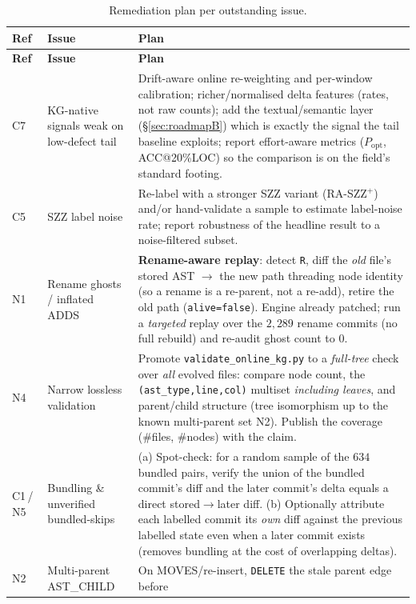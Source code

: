 \documentclass[11pt,a4paper]{article}
\newcommand{\code}[1]{\texttt{#1}}
\newcommand{\edge}[1]{\textsc{#1}}
\begin{document}
	\begin{longtable}{@{}p{0.9cm}p{5.2cm}p{8.4cm}@{}}
	\caption{Remediation plan per outstanding issue.}\label{tab:roadmapA}\\
	\toprule
	\textbf{Ref} & \textbf{Issue} & \textbf{Plan}\\
	\midrule
	\endfirsthead
	\toprule
	\textbf{Ref} & \textbf{Issue} & \textbf{Plan}\\
	\midrule
	\endhead
	C7 & KG-native signals weak on low-defect tail &
	Drift-aware online re-weighting and per-window calibration; richer/normalised
	delta features (rates, not raw counts); add the textual/semantic layer
	(\S\ref{sec:roadmapB}) which is exactly the signal the tail baseline exploits;
	report effort-aware metrics ($P_{\mathrm{opt}}$, ACC@20\%LOC) so the comparison is
	on the field's standard footing.\\
	\addlinespace
	C5 & SZZ label noise &
	Re-label with a stronger SZZ variant (RA-SZZ$^+$) and/or hand-validate a sample to
	estimate label-noise rate; report robustness of the headline result to a
	noise-filtered subset.\\
	\addlinespace
	N1 & Rename ghosts / inflated \edge{ADDS} &
	\textbf{Rename-aware replay}: detect \code{R}, diff the \emph{old} file's stored
	AST $\rightarrow$ the new path threading node identity (so a rename is a re-parent,
	not a re-add), retire the old path (\code{alive=false}). Engine already patched;
	run a \emph{targeted} replay over the $2{,}289$ rename commits (no full rebuild) and
	re-audit ghost count to $0$.\\
	\addlinespace
	N4 & Narrow lossless validation &
	Promote \texttt{validate\_online\_kg.py} to a \emph{full-tree} check over \emph{all}
	evolved files: compare node count, the \texttt{(ast\_type,line,col)} multiset
	\emph{including leaves}, and parent/child structure (tree isomorphism up to the
	known multi-parent set N2). Publish the coverage (\#files, \#nodes) with the claim.\\
	\addlinespace
	C1\,/\,N5 & Bundling \& unverified bundled-skips &
	(a) Spot-check: for a random sample of the $634$ bundled pairs, verify the union of
	the bundled commit's diff and the later commit's delta equals a direct
	stored$\rightarrow$later diff. (b) Optionally attribute each labelled commit its
	\emph{own} diff against the previous labelled state even when a later commit exists
	(removes bundling at the cost of overlapping deltas).\\
	\addlinespace
	N2 & Multi-parent \edge{AST\_CHILD} &
	On \edge{MOVES}/re-insert, \texttt{DELETE} the stale parent edge before

\end{longtable}
\end{document}

